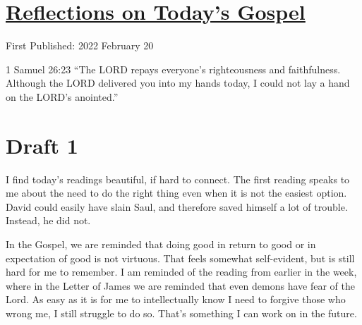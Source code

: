 \documentclass[12pt]{article}[titlepage]
\newcommand{\say}[1]{``#1''}
\newcommand{\1}{\={a}}
\newcommand{\2}{\={e}}
\newcommand{\3}{\={\i}}
\newcommand{\4}{\=o}
\newcommand{\5}{\=u}
\newcommand{\6}{\={A}}
\renewcommand{\,}{\textsuperscript{,}}
\begin{document}
\doublespacing
\section{\href{reflections-on-readings-7-ordinary-c-22.html}{Reflections on Today's Gospel}}
First Published: 2022 February 20

1 Samuel 26:23 \say{The LORD repays everyone's righteousness and faithfulness. Although the LORD delivered you into my hands today, I could not lay a hand on the LORD's anointed.}

\section{Draft 1}
I find today's readings beautiful, if hard to connect.
The first reading speaks to me about the need to do the right thing even when it is not the easiest option.
David could easily have slain Saul, and therefore saved himself a lot of trouble.
Instead, he did not.

In the Gospel, we are reminded that doing good in return to good or in expectation of good is not virtuous.
That feels somewhat self-evident, but is still hard for me to remember.
I am reminded of the reading from earlier in the week, where in the Letter of James we are reminded that even demons have fear of the Lord.
As easy as it is for me to intellectually know I need to forgive those who wrong me, I still struggle to do so.
That's something I can work on in the future.
\end{document}
